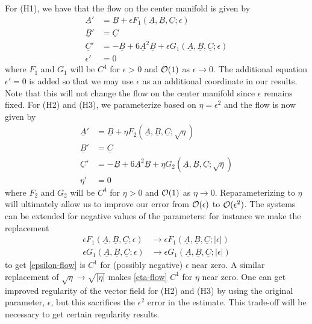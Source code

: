 For (H1), we have that the flow on the center manifold is given by
\begin{equation}\label{epsilon-flow}
	\begin{aligned}
		\underline A ' &= \underline B + \epsilon F_1(\underline A, \underline B, \underline C;\epsilon) \\
		\underline B ' &= \underline C \\
		\underline C ' &= - \underline B + 6 \underline A^2 \underline B + \epsilon G_1(\underline A, \underline B, \underline C;\epsilon) \\
		\epsilon' &= 0
	\end{aligned}
\end{equation}
where \(F_1\) and \(G_1\) will be \(C^4\) for \(\epsilon > 0\) and \(\mathcal{O}(1)\) as \(\epsilon \to 0\). The additional equation \(\epsilon' = 0\) is added so that we may use \(\epsilon\) as an additional coordinate in our results. Note that this will not change the flow on the center manifold since \(\epsilon\) remains fixed. For (H2) and (H3), we parameterize based on \(\eta = \epsilon^2\) and the flow is now given by
\begin{equation}\label{eta-flow}
	\begin{aligned}
		\underline A ' &= \underline B + \eta F_2(\underline A, \underline B, \underline C;\sqrt \eta) \\
		\underline B ' &= \underline C \\
		\underline C ' &= - \underline B + 6 \underline A^2 \underline B + \eta G_2(\underline A, \underline B, \underline C;\sqrt\eta) \\
		\eta' &= 0
	\end{aligned}
\end{equation}
where \(F_2\) and \(G_2\) will be \(C^4\) for \(\eta > 0\) and \(\mathcal{O}(1)\) as \(\eta \to 0\). Reparameterizing to \(\eta\) will ultimately allow us to improve our error from \(\mathcal{O}(\epsilon)\) to \(\mathcal{O}(\epsilon^2)\). The systems can be extended for negative values of the parameters: for instance we make the replacement
\begin{equation*}
\begin{aligned}
	\epsilon F_1(\underline A, \underline B, \underline C; \epsilon) &\rightarrow \epsilon F_1(\underline A, \underline B, \underline C; |\epsilon|) \\
	\epsilon G_1(\underline A, \underline B, \underline C; \epsilon) &\rightarrow \epsilon G_1(\underline A, \underline B, \underline C; |\epsilon|)
\end{aligned}
\end{equation*}
to get \cref{epsilon-flow} is \(C^1\) for (possibly negative) \(\epsilon\) near zero. A similar replacement of \(\sqrt \eta \rightarrow \sqrt{|\eta|}\) makes \cref{eta-flow} \(C^1\) for \(\eta\) near zero. One can get improved regularity of the vector field for (H2) and (H3) by using the original parameter, \(\epsilon\), but this sacrifices the \(\epsilon^2\) error in the estimate. This trade-off will be necessary to get certain regularity results.

